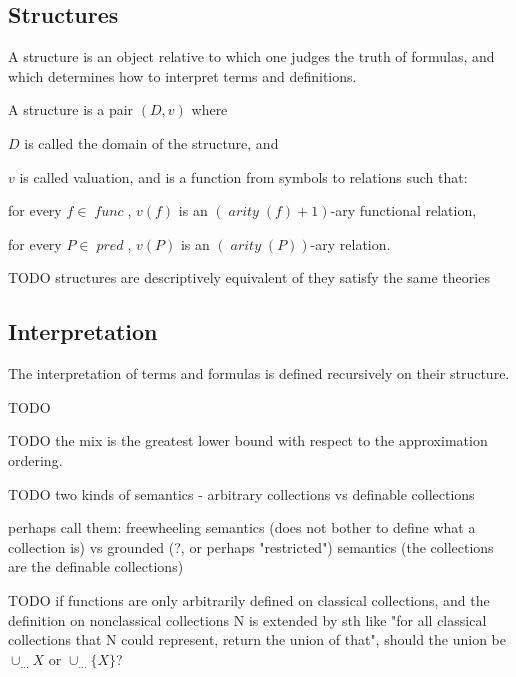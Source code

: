 \documentclass[oneside,12pt]{book}
\theoremstyle{definition}
\theoremstyle{remark}
\newcommand\var[1]{\mathop{\mathit{#1}}\nolimits}
\newcommand{\func}{\var{func}}
\newcommand{\pred}{\var{pred}}
\newcommand{\arity}{\var{arity}}
\begin{document}
\subsection{Structures}
A structure is an object relative to which one judges the truth of formulas,
and which determines how to interpret terms and definitions.

\begin{defBox}
  A structure is a pair $(D, v)$ where
  \begin{compactenum}
    \item $D$ is called the domain of the structure, and
    \item $v$ is called valuation, and is a function from symbols to relations such that:
      \begin{compactenum}
        \item for every $f \in \func$, $v(f)$ is an $(\arity(f) + 1)$-ary
          functional relation,
        \item for every $P \in \pred$, $v(P)$ is an $(\arity(P))$-ary relation.
      \end{compactenum}
  \end{compactenum}
\end{defBox}

TODO structures are descriptively equivalent of they satisfy the same theories

\subsection{Interpretation}
The interpretation of terms and formulas is defined recursively on their structure.

\begin{defBox}
  TODO
\end{defBox}

TODO the mix is the greatest lower bound with respect to the approximation ordering.

TODO two kinds of semantics - arbitrary collections vs definable collections

perhaps call them:
freewheeling semantics (does not bother to define what a collection is) vs
grounded (?, or perhaps "restricted") semantics (the collections are the definable
collections)

TODO if functions are only arbitrarily defined on classical collections, and the
definition on nonclassical collections N is extended by sth like "for all
classical collections that N could represent, return the union of that",
should the union be $\cup_{...} X$ or $\cup_{...} \{ X \}$?
\end{document}
